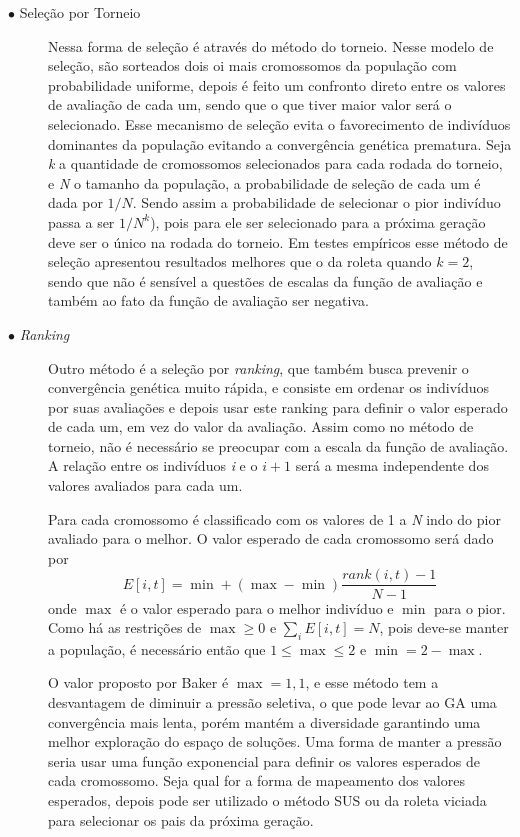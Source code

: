 \begin{description}
\item[$\bullet$ Seleção por Torneio] \text{}

Nessa forma de seleção é através do método do torneio. Nesse modelo de seleção, são sorteados dois oi mais cromossomos da população com probabilidade uniforme, depois é feito um confronto direto entre os valores de avaliação de cada um, sendo que o que tiver maior valor será o selecionado. Esse mecanismo de seleção evita o favorecimento de indivíduos dominantes da população evitando a convergência genética prematura. Seja \textit{k} a quantidade de cromossomos selecionados para cada rodada do torneio, e \textit{N} o tamanho da população, a probabilidade de seleção de cada um é dada por \(1/N\). Sendo assim a probabilidade de selecionar o pior indivíduo passa a ser \(1/N^k\)), pois para ele ser selecionado para a próxima geração deve ser o único na rodada do torneio. Em testes empíricos esse método de seleção apresentou resultados melhores que o da roleta quando \(k=2\), sendo que não é sensível a questões de escalas da função de avaliação e também ao fato da função de avaliação ser negativa. \cite{Linden2008}

\item[$\bullet$ \textit{Ranking}] \text{}

Outro método é a seleção por \textit{ranking}, que também busca prevenir o convergência genética muito rápida, e consiste em ordenar os indivíduos por suas avaliações e depois usar este ranking para definir o valor esperado de cada um, em vez do valor da avaliação. Assim como no método de torneio, não é necessário se preocupar com a escala da função de avaliação. A relação entre os indivíduos \textit{i} e o \(i+1\) será a mesma independente dos valores avaliados para cada um. 

Para cada cromossomo é classificado com os valores de 1 a \textit{N} indo do pior avaliado para o melhor. O valor esperado de cada cromossomo será dado por \[E[i,t] = \min + (\max - \min) \frac{rank(i,t) - 1}{N - 1} \] onde \(\max\) é o valor esperado para o melhor indivíduo e \(\min\) para o pior. Como há as restrições de \(\max \geq 0\) e \(\sum_i E[i,t] = N\), pois deve-se manter a população, é necessário então que \(1 \leq \max \leq 2\) e \(\min = 2 - \max\).

O valor proposto por Baker é \(\max = 1,1\), e esse método tem a desvantagem de diminuir a pressão seletiva, o que pode levar ao GA uma convergência mais lenta, porém mantém a diversidade garantindo uma melhor exploração do espaço de soluções. Uma forma de manter a pressão seria usar uma função exponencial para definir os valores esperados de cada cromossomo. Seja qual for a forma de mapeamento dos valores esperados, depois pode ser utilizado o método SUS ou da roleta viciada para selecionar os pais da próxima geração.\cite{Mitchell1996}



\end{description}

